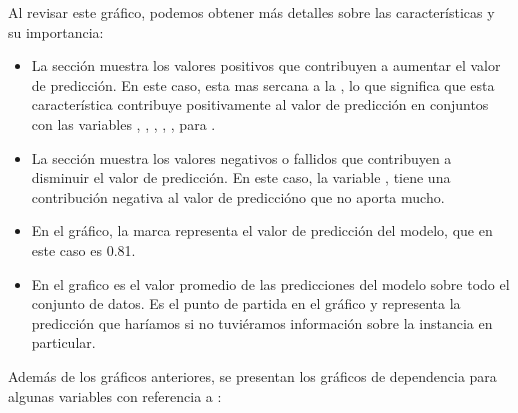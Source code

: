 Al revisar este gráfico, podemos obtener más detalles sobre las características y su importancia:

\begin{itemize}
    \item La sección  muestra los valores positivos que contribuyen a aumentar el valor de predicción. En este caso,  esta mas sercana a la , lo que significa que esta característica contribuye positivamente al valor de predicción en conjuntos con las variables , , , , ,  para .
    \item La sección  muestra los valores negativos o fallidos que contribuyen a disminuir el valor de predicción. En este caso, la variable , tiene una contribución negativa al valor de prediccióno que no aporta mucho.
    \item En el gráfico, la marca  representa el valor de predicción del modelo, que en este caso es 0.81.
    \item En el grafico  es el valor promedio de las predicciones del modelo sobre todo el conjunto de datos. Es el punto de partida en el gráfico y representa la predicción que haríamos si no tuviéramos información sobre la instancia en particular. 
\end{itemize}

Además de los gráficos anteriores, se presentan los gráficos de dependencia para algunas variables con referencia a :

